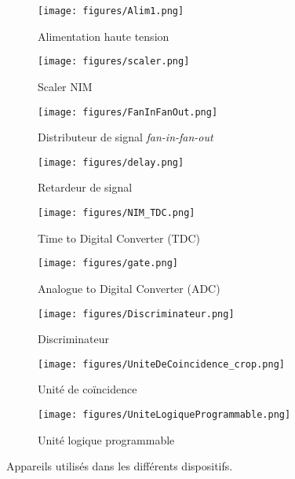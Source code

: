 \begin{figure}[p]
    \centering
    \begin{subfigure}[t]{0.2\textwidth}
        \texttt{[image: figures/Alim1.png]}
        \caption{Alimentation haute tension}
        \label{fig:HV}
    \end{subfigure}
    \hfill
    \begin{subfigure}[t]{0.2\textwidth}
        \texttt{[image: figures/scaler.png]}
        \caption{Scaler NIM}
        \label{fig:scaler1}
    \end{subfigure}
    \hfill
    \begin{subfigure}[t]{0.2\textwidth}
        \texttt{[image: figures/FanInFanOut.png]}
        \caption{Distributeur de signal \emph{fan-in-fan-out}}
        \label{fig:fifo}
    \end{subfigure}
    \hfill
    \begin{subfigure}[t]{0.2\textwidth}
        \texttt{[image: figures/delay.png]}
        \caption{Retardeur de signal}
        \label{fig:delay}
    \end{subfigure}
    
	\vspace{1cm}
    \begin{subfigure}[t]{0.2\textwidth}
        \texttt{[image: figures/NIM\_TDC.png]}
        \caption{Time to Digital Converter (TDC)}
        \label{fig:tdc}
    \end{subfigure}
    \hfill	
    \begin{subfigure}[t]{0.25\textwidth}
        \texttt{[image: figures/gate.png]}
        \caption{Analogue to Digital Converter (ADC)}
        \label{fig:adc}
    \end{subfigure}    
    \hfill
    \begin{subfigure}[t]{0.45\textwidth}
        \texttt{[image: figures/Discriminateur.png]}
        \caption{Discriminateur}
        \label{fig:discriminator}
    \end{subfigure}

	\vspace{1cm}    
    \begin{subfigure}[t]{0.45\textwidth}
        \texttt{[image: figures/UniteDeCoincidence\_crop.png]}
        \caption{Unit{\'e} de co{\"i}ncidence}
        \label{fig:coincidence}
    \end{subfigure}
    \hfill
    \begin{subfigure}[t]{0.45\textwidth}
        \texttt{[image: figures/UniteLogiqueProgrammable.png]}
        \caption{Unit{\'e} logique programmable}
        \label{fig:programmable}
    \end{subfigure}
    \caption{Appareils utilis{\'e}s dans les différents dispositifs.}
    \label{fig:devices}
\end{figure}
